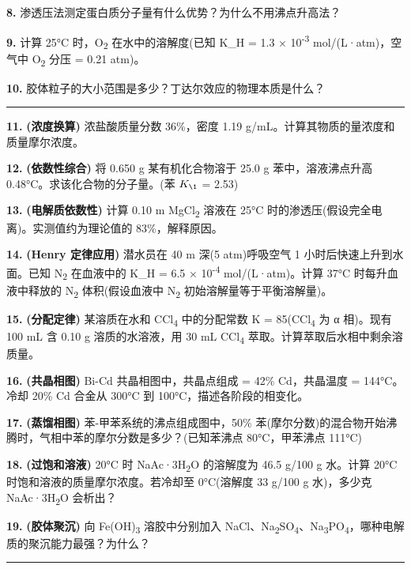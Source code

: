 \textbf{8.} 渗透压法测定蛋白质分子量有什么优势？为什么不用沸点升高法？

\textbf{9.} 计算 25°C 时，O\textsubscript{2} 在水中的溶解度(已知 K\_H = 1.3 × 10\textsuperscript{-3} mol/(L·atm)，空气中 O\textsubscript{2} 分压 = 0.21 atm)。

\textbf{10.} 胶体粒子的大小范围是多少？丁达尔效应的物理本质是什么？

\begin{center}\rule{0.5\linewidth}{0.5pt}\end{center}

\textbf{11.} \textbf{(浓度换算)} 浓盐酸质量分数 36\%，密度 1.19 g/mL。计算其物质的量浓度和质量摩尔浓度。

\textbf{12.} \textbf{(依数性综合)} 将 0.650 g 某有机化合物溶于 25.0 g 苯中，溶液沸点升高 0.48°C。求该化合物的分子量。(苯 \(K_{\1}\) = 2.53)

\textbf{13.} \textbf{(电解质依数性)} 计算 0.10 m MgCl\textsubscript{2} 溶液在 25°C 时的渗透压(假设完全电离)。实测值约为理论值的 83\%，解释原因。

\textbf{14.} \textbf{(Henry 定律应用)} 潜水员在 40 m 深(5 atm)呼吸空气 1 小时后快速上升到水面。已知 N\textsubscript{2} 在血液中的 K\_H = 6.5 × 10\textsuperscript{-4} mol/(L·atm)。计算 37°C 时每升血液中释放的 N\textsubscript{2} 体积(假设血液中 N\textsubscript{2} 初始溶解量等于平衡溶解量)。

\textbf{15.} \textbf{(分配定律)} 某溶质在水和 CCl\textsubscript{4} 中的分配常数 K = 85(CCl\textsubscript{4} 为 α 相)。现有 100 mL 含 0.10 g 溶质的水溶液，用 30 mL CCl\textsubscript{4} 萃取。计算萃取后水相中剩余溶质量。

\textbf{16.} \textbf{(共晶相图)} Bi-Cd 共晶相图中，共晶点组成 = 42\% Cd，共晶温度 = 144°C。冷却 20\% Cd 合金从 300°C 到 100°C，描述各阶段的相变化。

\textbf{17.} \textbf{(蒸馏相图)} 苯-甲苯系统的沸点组成图中，50\% 苯(摩尔分数)的混合物开始沸腾时，气相中苯的摩尔分数是多少？(已知苯沸点 80°C，甲苯沸点 111°C)

\textbf{18.} \textbf{(过饱和溶液)} 20°C 时 NaAc·3H\textsubscript{2}O 的溶解度为 46.5 g/100 g 水。计算 20°C 时饱和溶液的质量摩尔浓度。若冷却至 0°C(溶解度 33 g/100 g 水)，多少克 NaAc·3H\textsubscript{2}O 会析出？

\textbf{19.} \textbf{(胶体聚沉)} 向 Fe(OH)\textsubscript{3} 溶胶中分别加入 NaCl、Na\textsubscript{2}SO\textsubscript{4}、Na\textsubscript{3}PO\textsubscript{4}，哪种电解质的聚沉能力最强？为什么？

\begin{center}\rule{0.5\linewidth}{0.5pt}\end{center}

